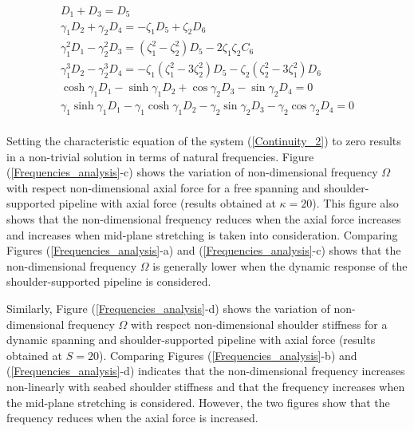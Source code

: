 \documentclass[3p,doublespacing,authoryear,11pt]{elsarticle} %
\begin{document}
\begin{equation}\label{Continuity_2}
 \begin{array}{l } 
\displaystyle   D_1 + D_3 = D_5\\
\displaystyle  \gamma_1 D_2 + \gamma_2 D_4 = -\zeta_1 D_5 + \zeta_2 D_6 \\
\displaystyle  \gamma_1^2 D_1 - \gamma_2^2 D_3 = (\zeta_1^2 -\zeta_2^2)D_5 -2 \zeta_1\zeta_2 C_6 \\
\displaystyle  \gamma_1^3 D_2 - \gamma_2^3 D_4 = - \zeta_1 (\zeta_1^2 - 3\zeta_2^2) D_5 - \zeta_2 (\zeta_2^2 - 3\zeta_1^2) D_6 \\
\displaystyle    \cosh \gamma_1 D_1 - \sinh \gamma_1 D_2 + \cos \gamma_2D_3   -  \sin \gamma_2 D_4= 0 \\
\displaystyle   \gamma_1 \sinh \gamma_1 D_1 - \gamma_1 \cosh \gamma_1 D_2 -  \gamma_2 \sin  \gamma_2D_3   -   \gamma_2 \cos \gamma_2 D_4 = 0 \\
  \end{array}  
\end{equation}

Setting the characteristic equation of the system (\ref{Continuity_2}) to zero results in a non-trivial solution in terms of natural frequencies. Figure (\ref{Frequencies_analysis}-c) shows the variation of non-dimensional frequency $\Omega$ with respect non-dimensional axial force for a free spanning and shoulder-supported pipeline with axial force (results obtained at $\kappa = 20$). This figure also shows that the non-dimensional frequency reduces when the axial force increases and increases when mid-plane stretching is taken into consideration. Comparing Figures (\ref{Frequencies_analysis}-a) and (\ref{Frequencies_analysis}-c) shows that the non-dimensional frequency $\Omega$ is generally lower when the dynamic response of the shoulder-supported pipeline is considered.


Similarly, Figure (\ref{Frequencies_analysis}-d) shows the variation of non-dimensional frequency $\Omega$ with respect non-dimensional shoulder stiffness for a dynamic spanning and shoulder-supported pipeline with axial force (results obtained at $S = 20$). Comparing Figures (\ref{Frequencies_analysis}-b) and (\ref{Frequencies_analysis}-d) indicates that the non-dimensional frequency increases non-linearly with seabed shoulder stiffness and that the frequency increases when the mid-plane stretching is considered. However, the two figures show that the frequency reduces when the axial force is increased. 
\end{document}
